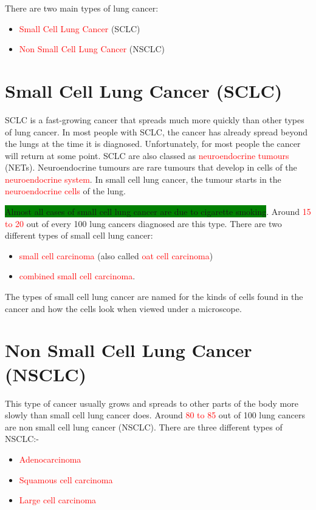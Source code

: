 There are two main types of lung cancer:
\begin{itemize}
    \item \textcolor{red}{Small Cell Lung Cancer} (SCLC)
    \item \textcolor{red}{Non Small Cell Lung Cancer} (NSCLC)    
\end{itemize}
\section {Small Cell Lung Cancer (SCLC)}

SCLC is a fast-growing cancer that spreads much more quickly than other types of lung cancer. In most people with SCLC, the cancer has already spread beyond the lungs at the time it is diagnosed. Unfortunately, for most people the cancer will return at some point. SCLC are also classed as \textcolor{red}{neuroendocrine tumours} (NETs). Neuroendocrine tumours are rare tumours that develop in cells of the \textcolor{red}{neuroendocrine system}. In small cell lung cancer, the tumour starts in the \textcolor{red}{neuroendocrine cells} of the lung.

\colorbox{green}{Almost all cases of small cell lung cancer are due to cigarette smoking}. Around \textcolor{red}{15 to 20} out of every 100 lung cancers diagnosed are this type. There are two different types of small cell lung cancer:

\begin{itemize}
    \item \textcolor{red}{small cell carcinoma} (also called \textcolor{red}{oat cell carcinoma})
    \item \textcolor{red}{combined small cell carcinoma}.
\end{itemize}

The types of small cell lung cancer are named for the kinds of cells found in the cancer and how the cells look when viewed under a microscope. 

\section{Non Small Cell Lung Cancer (NSCLC)} 
This type of cancer usually grows and spreads to other parts of the body more slowly than small cell lung cancer does. Around \textcolor{red}{80 to 85} out of 100 lung cancers are non small cell lung cancer (NSCLC). There are three different types of NSCLC:-
\begin{itemize}
    \item \textcolor{red}{Adenocarcinoma}
    \item \textcolor{red}{Squamous cell carcinoma}
    \item \textcolor{red}{Large cell carcinoma}
\end{itemize}

